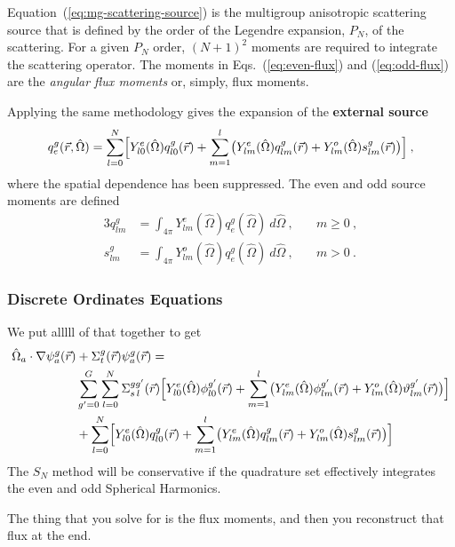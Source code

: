 \documentclass[12pt]{article}
\newcommand{\Macro}{\ensuremath{\Sigma}}
\newcommand{\vecr}{\ensuremath{\vec{r}}}
\newcommand{\vOmega}{\ensuremath{\hat{\Omega}}}
\newcommand{\evenp}{\ensuremath{\phi^{g'}}}
\newcommand{\oddp}{\ensuremath{\vartheta^{g'}}}
\newcommand{\sigg}[1]{\ensuremath{\Macro^{gg'}_{s\,#1}}}
\begin{document}
Equation~(\ref{eq:mg-scattering-source}) is the multigroup anisotropic
scattering source that is defined by the order of the Legendre expansion,
$P_N$, of the scattering.  For a given $P_N$ order, $(N+1)^2$ moments are
required to integrate the scattering operator.  The moments in
Eqs.~(\ref{eq:even-flux}) and (\ref{eq:odd-flux}) are the \textit{angular flux moments} or, simply, flux moments.
  
Applying the same methodology gives the expansion of the \textbf{external source}
\begin{equation}
  q^g_e(\vec{r}, \vOmega) = \sum_{l=0}^{N}\Bigl[
  Y^e_{l0}(\vOmega)q^g_{l0}(\vec{r}) +
  \sum_{m=1}^{l}
  \bigr(
  Y^e_{lm}(\vOmega)q^g_{lm}(\vec{r}) + Y^o_{lm}(\vOmega)s^g_{lm}(\vec{r})\bigr)
  \Bigr]\:,
  \label{eq:mg-external-source}
\end{equation}
where the spatial dependence has been suppressed.  The even and odd source
moments are defined
\begin{alignat}{3}
  q^g_{lm} &= \int_{4\pi}Y^e_{lm}(\vOmega)q^g_e(\vOmega)\:d\vOmega\:,
  \quad&m\ge 0\:,\label{eq:even-source}\\
  s^g_{lm} &= \int_{4\pi}Y^o_{lm}(\vOmega)q^g_e(\vOmega)\:d\vOmega\:,
  \quad&m>0\:.\label{eq:odd-source}
\end{alignat}

\subsubsection*{Discrete Ordinates Equations}
We put alllll of that together to get
\begin{align*}
\vOmega_a \cdot \nabla \psi^g_a(\vecr) &+ \Sigma^g_t(\vecr)\psi^g_a(\vecr) = \\
&\sum_{g'=0}^G
  \sum_{l=0}^N
  \sigg{l}(\vec{r})
  \Bigl[
  Y^e_{l0}(\vOmega)\evenp_{l0}(\vec{r}) +
  \sum_{m=1}^l
  \bigl(
  Y^e_{lm}(\vOmega)\evenp_{lm}(\vec{r}) +
  Y^o_{lm}(\vOmega)\oddp_{lm}(\vec{r})
  \bigr)\Bigr]\\
&+\sum_{l=0}^{N}\Bigl[
  Y^e_{l0}(\vOmega)q^g_{l0}(\vec{r}) +
  \sum_{m=1}^{l}
  \bigr(
  Y^e_{lm}(\vOmega)q^g_{lm}(\vec{r}) + Y^o_{lm}(\vOmega)s^g_{lm}(\vec{r})\bigr)
  \Bigr]
\end{align*}
The $S_N$ method will be conservative if the quadrature set effectively
integrates the even and odd Spherical Harmonics.

The thing that you solve for is the flux moments, and then you reconstruct that flux at the end.
\end{document}
